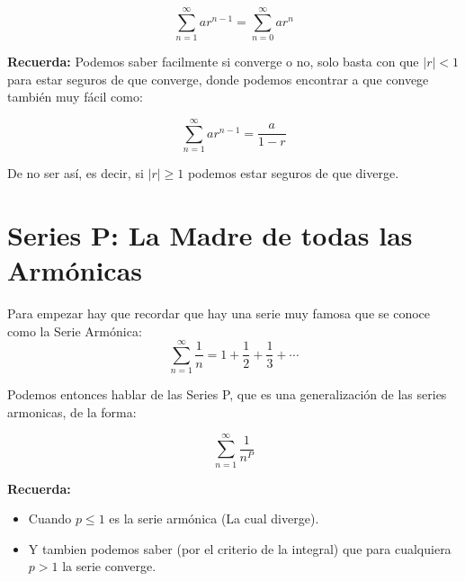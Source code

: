 \documentclass[12pt]{report}							    %
\begin{document}
        \begin{equation}
            \sum_{n=1}^{\infty} ar^{n-1} = \sum_{n=0}^{\infty} ar^n 
        \end{equation}

        \textbf{Recuerda:}
        Podemos saber facilmente si converge o no, solo basta con que $|r| < 1$ 
        para estar seguros de que converge, donde podemos encontrar a que convege
        también muy fácil como:

        \begin{equation}
            \sum_{n=1}^{\infty} ar^{n-1} = \frac{a}{1-r}
        \end{equation}

        De no ser así, es decir, si $|r| \geq 1$ podemos estar seguros de que diverge.



    \clearpage
    \section{Series P: La Madre de todas las Armónicas}
        Para empezar hay que recordar que hay una serie muy famosa que se conoce como
        la Serie Armónica:
        \begin{equation}
            \sum_{n=1}^{\infty} \frac{1}{n} = 1 + \frac{1}{2}  + \frac{1}{3} + \cdots
        \end{equation}

        Podemos entonces hablar de las Series P, que es una generalización de las series
        armonicas, de la forma:

        \begin{equation}
            \sum_{n=1}^{\infty} \frac{1}{n^P}
        \end{equation}

        \textbf{Recuerda:}
        \begin{itemize}
            \item Cuando $p\leq1$ es la serie armónica (La cual diverge).
            \item Y tambien podemos saber (por el criterio de la integral) que para
            cualquiera $p > 1$ la serie converge.
        \end{itemize}


    \clearpage
\end{document}
